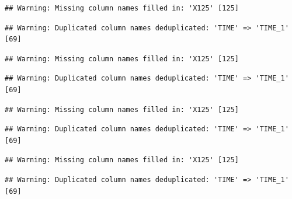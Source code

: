 \documentclass[
]{krantz}
\begin{document}
\begin{verbatim}
## Warning: Missing column names filled in: 'X125' [125]
\end{verbatim}

\begin{verbatim}
## Warning: Duplicated column names deduplicated: 'TIME' => 'TIME_1' [69]
\end{verbatim}

\begin{verbatim}
## Warning: Missing column names filled in: 'X125' [125]
\end{verbatim}

\begin{verbatim}
## Warning: Duplicated column names deduplicated: 'TIME' => 'TIME_1' [69]
\end{verbatim}

\begin{verbatim}
## Warning: Missing column names filled in: 'X125' [125]
\end{verbatim}

\begin{verbatim}
## Warning: Duplicated column names deduplicated: 'TIME' => 'TIME_1' [69]
\end{verbatim}

\begin{verbatim}
## Warning: Missing column names filled in: 'X125' [125]
\end{verbatim}

\begin{verbatim}
## Warning: Duplicated column names deduplicated: 'TIME' => 'TIME_1' [69]
\end{verbatim}
\end{document}
